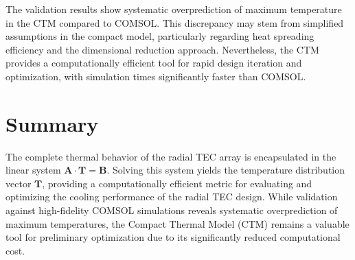 \documentclass[10pt,a4paper,twocolumn]{article}
\newenvironment{customnote}[1][]{
    \begin{tcolorbox}[NoteBox, #1]
}{
    \end{tcolorbox}
}
\begin{document}
\begin{customnote}
  The validation results show systematic overprediction of maximum temperature in the CTM compared to COMSOL. This discrepancy may stem from simplified assumptions in the compact model, particularly regarding heat spreading efficiency and the dimensional reduction approach. Nevertheless, the CTM provides a computationally efficient tool for rapid design iteration and optimization, with simulation times significantly faster than COMSOL.
\end{customnote}

\section{Summary}

The complete thermal behavior of the radial TEC array is encapsulated in the linear system $\mathbf{A} \cdot \mathbf{T} = \mathbf{B}$. Solving this system yields the temperature distribution vector $\mathbf{T}$, providing a computationally efficient metric for evaluating and optimizing the cooling performance of the radial TEC design. While validation against high-fidelity COMSOL simulations reveals systematic overprediction of maximum temperatures, the Compact Thermal Model (CTM) remains a valuable tool for preliminary optimization due to its significantly reduced computational cost.
\end{document}
